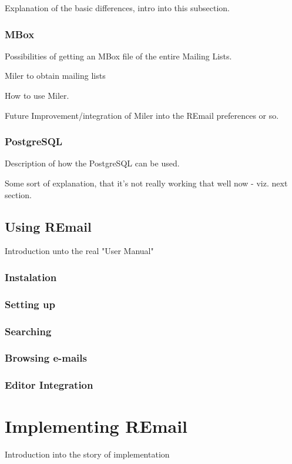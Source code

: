 \documentclass[]{usiinfthesis}
\begin{document}
Explanation of the basic differences, intro into this subsection.

\subsubsection{MBox}
Possibilities of getting an MBox file of the entire Mailing Lists.

Miler to obtain mailing lists

How to use Miler.

Future Improvement/integration of Miler into the REmail preferences or so.

\subsubsection{PostgreSQL}

Description of how the PostgreSQL can be used.

Some sort of explanation, that it's not really working that well now - viz. next section.

\subsection{Using REmail}
Introduction unto the real "User Manual"

\subsubsection{Instalation}

\subsubsection{Setting up}

\subsubsection{Searching}

\subsubsection{Browsing e-mails}

\subsubsection{Editor Integration}

\section{Implementing REmail}
Introduction into the story of implementation
\end{document}
